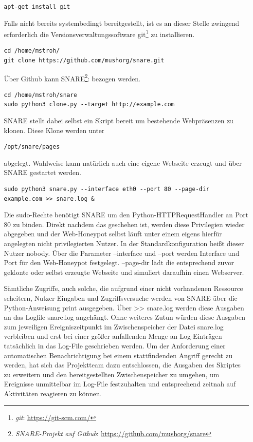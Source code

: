 \begin{lstlisting}[style=customc]
apt-get install git
\end{lstlisting}

Falls nicht bereits systembedingt bereitgestellt, ist es an dieser Stelle zwingend erforderlich die Versionsverwaltungssoftware git\footnote{ \textit{git}: \url{https://git-scm.com/}} zu installieren.

\begin{lstlisting}[style=customc]
cd /home/mstroh/
git clone https://github.com/mushorg/snare.git
\end{lstlisting}

Über Github kann SNARE\footnote{ \textit{SNARE-Projekt auf Github}: \url{https://github.com/mushorg/snare}}: bezogen werden.

\begin{lstlisting}[style=customc]
cd /home/mstroh/snare
sudo python3 clone.py --target http://example.com
\end{lstlisting}

SNARE stellt dabei selbst ein Skript bereit um bestehende Webpräsenzen zu klonen. Diese Klone werden unter
\begin{lstlisting}[style=customc]
/opt/snare/pages
\end{lstlisting}
abgelegt. Wahlweise kann natürlich auch eine eigene Webseite erzeugt und über SNARE gestartet werden.

\begin{lstlisting}[style=customc]
sudo python3 snare.py --interface eth0 --port 80 --page-dir example.com >> snare.log &
\end{lstlisting}
Die sudo-Rechte benötigt SNARE um den Python-HTTPRequestHandler an Port 80 zu binden. Direkt nachdem das geschehen ist, werden diese Privilegien wieder abgegeben und der Web-Honeypot selbst läuft unter einem eigens hierfür angelegten nicht privilegierten Nutzer. In der Standardkonfiguration heißt dieser Nutzer nobody. Über die Parameter \grqq{}--interface\grqq{} und \grqq{}--port\grqq{} werden Interface und Port für den Web-Honeypot festgelegt. \grqq{}--page-dir\grqq{} lädt die entsprechend zuvor geklonte oder selbst erzeugte Webseite und simuliert daraufhin einen Webserver. 

Sämtliche Zugriffe, auch solche, die aufgrund einer nicht vorhandenen Ressource scheitern, Nutzer-Eingaben und Zugriffsversuche werden von SNARE über die Python-Anweisung print ausgegeben. Über \grqq{}>> snare.log\grqq{} werden diese Ausgaben an das Logfile \grqq{}snare.log\grqq{} angehängt.  Ohne weiteres Zutun würden diese Ausgaben zum jeweiligen Ereigniszeitpunkt im Zwischenspeicher der Datei \grqq{}snare.log\grqq{} verbleiben und erst bei einer größer anfallenden Menge an Log-Einträgen tatsächlich in das Log-File geschrieben werden. Um der Anforderung einer automatischen Benachrichtigung bei einem stattfindenden Angriff gerecht zu werden, hat sich das Projektteam dazu entschlossen, die Ausgaben des Skriptes zu erweitern und den bereitgestellten Zwischenspeicher zu umgehen, um Ereignisse unmittelbar im Log-File festzuhalten und entsprechend zeitnah auf Aktivitäten reagieren zu können. 

